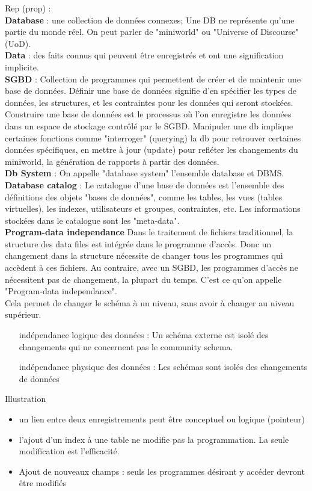 \noindent
Rep (prop) :\\ 
\textbf{Database} : une collection de données connexes; 
Une DB ne représente qu'une partie du monde réel. On peut parler de 
"miniworld" ou "Universe of Discourse" (UoD). \\
\textbf{Data} : des faits connus qui peuvent être enregistrés et ont une signification 
implicite.\\
\textbf{SGBD} : Collection de programmes qui permettent de créer et de maintenir 
une base de données. 
Définir une base de données signifie d'en spécifier les types de données, 
les structures, et les contraintes pour les données qui seront stockées. 
Construire une base de données est le processus où l'on enregistre les données 
dans un espace de stockage contrôlé par le SGBD. Manipuler une db implique 
certaines fonctions comme "interroger" (querying) la db pour retrouver 
certaines données spécifiques, en mettre à jour (update) pour refléter 
les changements du miniworld, la génération de rapports à partir des données.\\
\textbf{Db System} : On appelle "database system" l'ensemble database et DBMS. \\
\textbf{Database catalog} : Le catalogue d'une base de données est 
l'ensemble des définitions des objets "bases de données", comme les 
tables, les vues (tables virtuelles), les indexes, utilisateurs et groupes, contraintes, etc. Les informations stockées dans le catalogue sont 
les "meta-data".\\
\textbf{Program-data independance} Dans le traitement de fichiers traditionnel, 
la structure des data files est intégrée dans le programme d'accès. 
Donc un changement dans la structure nécessite de changer tous les programmes
qui accèdent à ces fichiers. 
Au contraire, avec un SGBD, les programmes d'accès ne nécessitent pas de changement, 
la plupart du temps. C'est ce qu'on appelle "Program-data independance". \\
Cela permet de changer le schéma à un niveau, sans avoir à changer au niveau supérieur. 
\begin{itemize}
\item[indépendance logique des données] : Un schéma externe est isolé des changements 
qui ne concernent pas le community schema.
\item[indépendance physique des données] : Les schémas sont isolés des changements de données
\end{itemize}

Illustration 
\begin{itemize}
\item un lien entre deux enregistrements peut être conceptuel ou logique (pointeur)
\item l'ajout d'un index à une table ne modifie pas la programmation. La 
seule modification est l'efficacité.
\item Ajout de nouveaux champs : seuls les programmes désirant y accéder devront être modifiés
\end{itemize}

